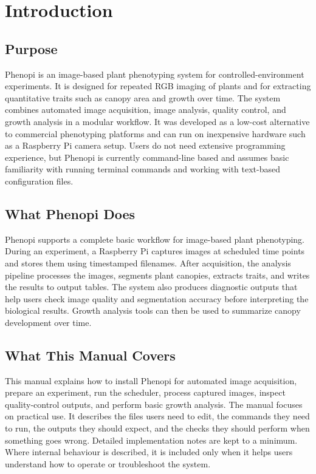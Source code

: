 \section{Introduction}

\subsection{Purpose}

Phenopi is an image-based plant phenotyping system for controlled-environment
experiments. It is designed for repeated RGB imaging of plants and for
extracting quantitative traits such as canopy area and growth over time. The
system combines automated image acquisition, image analysis, quality control,
and growth analysis in a modular workflow. It was developed as a low-cost
alternative to commercial phenotyping platforms and can run on inexpensive
hardware such as a Raspberry Pi camera setup. Users do not need extensive
programming experience, but Phenopi is currently command-line based and assumes
basic familiarity with running terminal commands and working with text-based
configuration files.

\subsection{What Phenopi Does}

Phenopi supports a complete basic workflow for image-based plant phenotyping.
During an experiment, a Raspberry Pi captures images at scheduled time points
and stores them using timestamped filenames. After acquisition, the analysis
pipeline processes the images, segments plant canopies, extracts traits, and
writes the results to output tables. The system also produces diagnostic
outputs that help users check image quality and segmentation accuracy before
interpreting the biological results. Growth analysis tools can then be used to
summarize canopy development over time.

\subsection{What This Manual Covers}

This manual explains how to install Phenopi for automated image acquisition,
prepare an experiment, run the scheduler, process captured images, inspect
quality-control outputs, and perform basic growth analysis. The manual focuses
on practical use. It describes the files users need to edit, the commands they
need to run, the outputs they should expect, and the checks they should perform
when something goes wrong. Detailed implementation notes are kept to a minimum.
Where internal behaviour is described, it is included only when it helps users
understand how to operate or troubleshoot the system.
